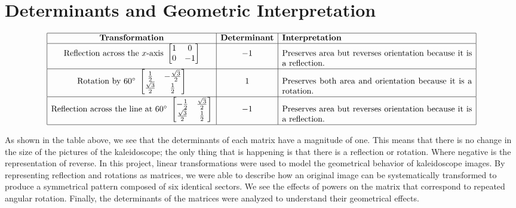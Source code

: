\section*{Determinants and Geometric Interpretation}
\[
\begin{array}{|c|c|p{8cm}|}
\hline
\textbf{Transformation} & \textbf{Determinant} & \textbf{Interpretation} \\
\hline
\text{Reflection across the } x\text{-axis } 
\begin{bmatrix}
1 & 0\\
0 & -1
\end{bmatrix}
& -1
& Preserves area but reverses orientation because it is a reflection. \\
\hline
\text{Rotation by }60^\circ \ 
\begin{bmatrix}
\frac{1}{2} & -\frac{\sqrt{3}}{2}\\
\frac{\sqrt{3}}{2} & \frac{1}{2}
\end{bmatrix}
& 1
& Preserves both area and orientation because it is a rotation. \\
\hline
\text{Reflection across the line at }60^\circ \
\begin{bmatrix}
-\frac{1}{2} & \frac{\sqrt{3}}{2}\\
\frac{\sqrt{3}}{2} & \frac{1}{2}
\end{bmatrix}
& -1
& Preserves area but reverses orientation because it is a reflection. \\
\hline
\end{array}
\]

As shown in the table above, we see that the determinants of each matrix have a magnitude of one. This means that there is no change in the size of the pictures of the kaleidoscope; the only thing that is happening is that there is a reflection or rotation. Where negative is the representation of reverse.
In this project, linear transformations were used to model the geometrical behavior of kaleidoscope images. By representing reflection and rotations as matrices, we were able to describe how an original image can be systematically transformed to produce a symmetrical pattern composed of six identical sectors. We see the effects of powers on the matrix that correspond to repeated angular rotation. Finally, the determinants of the matrices were analyzed to understand their geometrical effects. 

